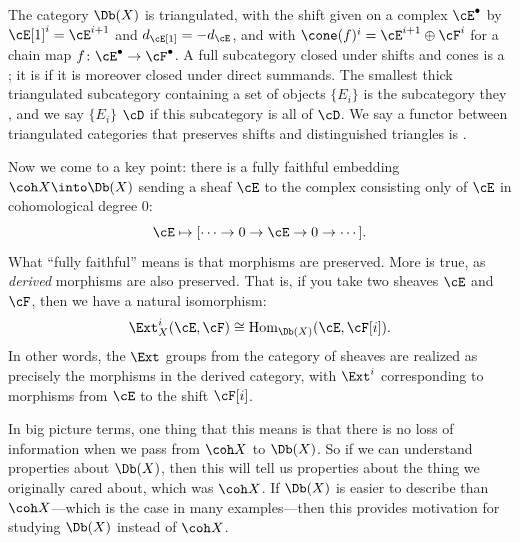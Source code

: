 \documentclass{amsart}
\begin{document}
The category $\Db(X)$ is triangulated, with the shift given on a complex $\cE^\bullet$ by $\cE[1]^i=\cE^{i+1}$ and $d_{\cE[1]}=-d_{\cE}$, and with $\cone(f)^i=\cE^{i+1}\oplus \cF^i$ for a chain map $f\colon\cE^\bullet\to\cF^\bullet$. A full subcategory closed under shifts and cones is a ; it is  if it is moreover closed under direct summands. The smallest thick triangulated subcategory containing a set of objects $\{E_i\}$ is the subcategory they , and we say $\{E_i\}$  $\cD$ if this subcategory is all of $\cD$. We say a functor between triangulated categories that preserves shifts and distinguished triangles is . 

Now we come to a key point:  there is a fully faithful embedding $\coh X\into \Db(X)$ sending a sheaf $\cE$ to the complex consisting only of $\cE$ in cohomological degree $0$:
\[
\cE \mapsto [\cdots\to  0 \to \cE \to  0\to \cdots].
\]
What ``fully faithful'' means is that morphisms are preserved.  More is true, as \emph{derived} morphisms are also preserved.  That is, if you take two sheaves $\cE$ and $\cF$, then we have a natural isomorphism:
\[ \Ext^i_X(\cE,\cF)\cong \Hom_{\Db(X)}(\cE,\cF[i]). \]
In other words, the $\Ext$ groups from the category of sheaves are realized as precisely the morphisms in the derived category, with $\Ext^i$ corresponding to morphisms from $\cE$ to the shift $\cF[i]$.

    In big picture terms, one thing that this means is that there is no loss of information when we pass from $\coh X$ to $\Db(X)$.  So if we can understand properties about $\Db(X)$, then this will tell us properties about the thing we originally cared about, which was $\coh X$.  If $\Db(X)$ is easier to describe than $\coh X$---which is the case in many examples---then this provides motivation for studying $\Db(X)$ instead of $\coh X$.
\end{document}
